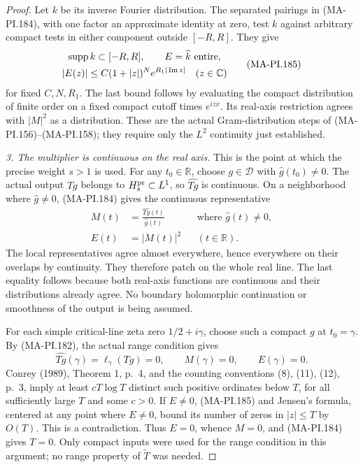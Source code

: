 \begin{proof}
Let \(k\) be its inverse Fourier distribution. The separated
pairings in (MA-PI.184), with one factor an approximate
identity at zero, test \(k\) against arbitrary compact tests
in either component outside \([-R,R]\). They give
\[
 \begin{gathered}
 \operatorname{supp}k\subset[-R,R],\qquad
 E=\widehat k\ \hbox{entire},\\
 |E(z)|\le C(1+|z|)^N e^{R_1|\operatorname{Im}z|}
          \quad(z\in\mathbb C)
 \end{gathered}
 \tag{MA-PI.185}
\]
for fixed \(C,N,R_1\). The last bound follows by evaluating
the compact distribution of finite order on a fixed compact
cutoff times \(e^{izx}\). Its real-axis restriction agrees
with \(|M|^2\) as a distribution. These are the actual
Gram-distribution steps of (MA-PI.156)--(MA-PI.158);
they require only the \(L^2\) continuity just established.

\emph{3. The multiplier is continuous on the real axis.}
This is the point at which the precise weight \(s>1\) is used.
For any \(t_0\in\mathbb R\), choose \(g\in\mathcal D\) with
\(\widehat g(t_0)\ne0\). The actual output \(Tg\) belongs to
\(H_s^{\rm pr}\subset L^1\), so \(\widehat{Tg}\) is continuous.
On a neighborhood where \(\widehat g\ne0\), (MA-PI.184) gives
the continuous representative
\[
 \begin{aligned}
        M(t)&=\frac{\widehat{Tg}(t)}{\widehat g(t)}
                    &&\text{where }\widehat g(t)\ne0,\\
        E(t)&=|M(t)|^2 &&(t\in\mathbb R).
 \end{aligned}
 \tag{MA-PI.186}
\]
The local representatives agree almost everywhere, hence
everywhere on their overlaps by continuity. They therefore
patch on the whole real line. The last equality follows
because both real-axis functions are continuous and their
distributions already agree. No boundary holomorphic
continuation or smoothness of the output is being assumed.

For each simple critical-line zeta zero \(1/2+i\gamma\),
choose such a compact \(g\) at \(t_0=\gamma\).
By (MA-PI.182), the actual range condition gives
\[
     \widehat{Tg}(\gamma)=\ell_\gamma(Tg)=0,
                     \qquad M(\gamma)=0,\qquad E(\gamma)=0.
 \tag{MA-PI.187}
\]
Conrey (1989), Theorem 1, p.~4, and the counting conventions
(8), (11), (12), p.~3, imply at least \(cT\log T\) distinct
such positive ordinates below \(T\), for all sufficiently
large \(T\) and some \(c>0\).
If \(E\ne0\), (MA-PI.185) and Jensen's formula, centered at
any point where \(E\ne0\), bound its number of zeros in
\(|z|\le T\) by \(O(T)\). This is a contradiction.
Thus \(E=0\), whence \(M=0\), and (MA-PI.184) gives \(T=0\).
Only compact inputs were used for the range condition in
this argument; no range property of \(\widetilde T\) was needed.


\end{proof}
